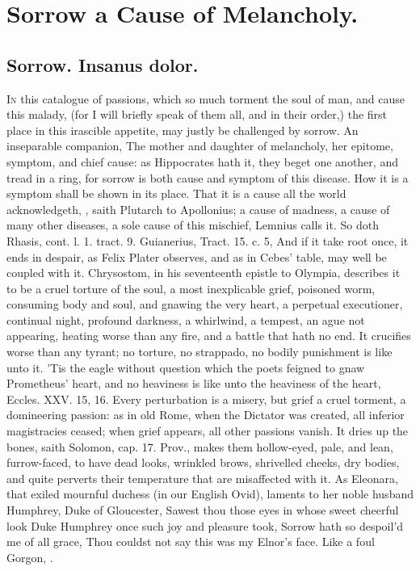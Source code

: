 {%
\section{Sorrow a Cause of Melancholy.}

\subsection{Sorrow. Insanus dolor.}
\lettrine{I}{n} this catalogue of passions, which so much torment the soul of man, and cause
this malady, (for I will briefly speak of them all, and in their order,) the
first place in this irascible appetite, may justly be challenged by sorrow. An
inseparable companion, The mother and daughter of melancholy,
her epitome, symptom, and chief cause: as Hippocrates hath it, they beget one
another, and tread in a ring, for sorrow is both cause and symptom of this
disease. How it is a symptom shall be shown in its place.
That it is a cause all the world acknowledgeth, , saith Plutarch to Apollonius; a
cause of madness, a cause of many other diseases, a sole cause of this
mischief, Lemnius calls it. So doth Rhasis, cont. l. 1. tract. 9.
Guianerius, Tract. 15. c. 5, And if it take root once, it ends in
despair, as Felix Plater observes, and as in Cebes' table,
may well be coupled with it. Chrysostom, in his seventeenth
epistle to Olympia, describes it to be a cruel torture of the soul, a
most inexplicable grief, poisoned worm, consuming body and soul, and
gnawing the very heart, a perpetual executioner, continual night,
profound darkness, a whirlwind, a tempest, an ague not appearing,
heating worse than any fire, and a battle that hath no end. It
crucifies worse than any tyrant; no torture, no strappado, no bodily
punishment is like unto it. 'Tis the eagle without question which the
poets feigned to gnaw Prometheus' heart, and no heaviness is like
unto the heaviness of the heart, Eccles. XXV. 15, 16. Every
perturbation is a misery, but grief a cruel torment, a domineering
passion: as in old Rome, when the Dictator was created, all inferior
magistracies ceased; when grief appears, all other passions vanish. It
dries up the bones, saith Solomon, cap. 17. Prov., makes them
hollow-eyed, pale, and lean, furrow-faced, to have dead looks, wrinkled
brows, shrivelled cheeks, dry bodies, and quite perverts their
temperature that are misaffected with it. As Eleonara, that exiled
mournful duchess (in our English Ovid), laments to her noble
husband Humphrey, Duke of Gloucester,
Sawest thou those eyes in whose sweet cheerful look
Duke Humphrey once such joy and pleasure took,
Sorrow hath so despoil'd me of all grace,
Thou couldst not say this was my Elnor's face.
Like a foul Gorgon, \etc{}.

}
